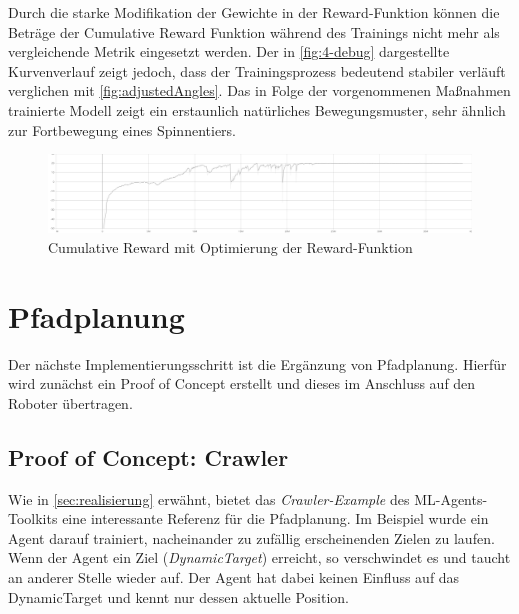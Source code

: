 Durch die starke Modifikation der Gewichte in der Reward-Funktion können die Beträge der Cumulative Reward Funktion während des Trainings nicht mehr als vergleichende Metrik eingesetzt werden.
Der in \autoref{fig:4-debug} dargestellte Kurvenverlauf zeigt jedoch, dass der Trainingsprozess bedeutend stabiler verläuft verglichen mit \autoref{fig:adjustedAngles}.
Das in Folge der vorgenommenen Maßnahmen trainierte Modell zeigt ein erstaunlich natürliches Bewegungsmuster, sehr ähnlich zur Fortbewegung eines Spinnentiers.

\begin{figure}
    
\end{figure}


\begin{figure}
    \centering
    \includegraphics[width=\textwidth]{Bilder/ml-agents/Environment_Cumulative Reward-4-debug-extended-vector-space.pdf}
    \caption{Cumulative Reward mit Optimierung der Reward-Funktion}
    \label{fig:4-debug}
\end{figure}


\section{Pfadplanung}
Der nächste Implementierungsschritt ist die Ergänzung von Pfadplanung.
Hierfür wird zunächst ein Proof of Concept erstellt und dieses im Anschluss auf den Roboter übertragen.

\subsection{Proof of Concept: Crawler}
Wie in \autoref{sec:realisierung} erwähnt, bietet das \emph{Crawler-Example} des ML-Agents-Toolkits eine interessante Referenz für die Pfadplanung.
Im Beispiel wurde ein Agent darauf trainiert, nacheinander zu zufällig erscheinenden Zielen zu laufen.
Wenn der Agent ein Ziel (\emph{DynamicTarget}) erreicht, so verschwindet es und taucht an anderer Stelle wieder auf.
Der Agent hat dabei keinen Einfluss auf das DynamicTarget und kennt nur dessen aktuelle Position.

